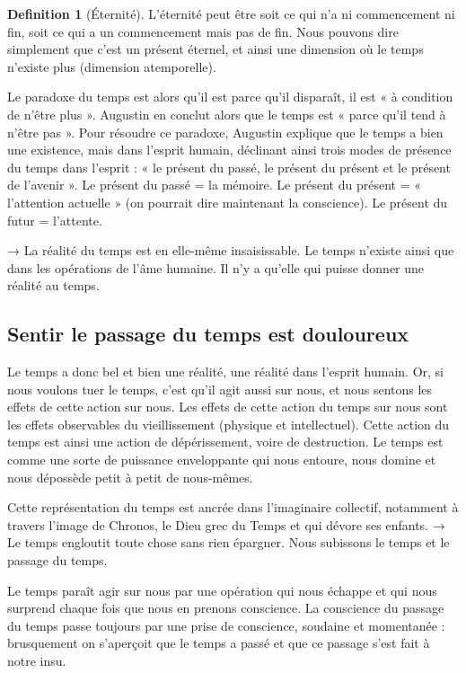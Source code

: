 \documentclass[french]{book}
\theoremstyle{definition}
\newtheorem*{dfn}{Definition}
\begin{document}
\begin{dfn}[Éternité]
L’éternité peut être soit ce qui n’a ni commencement ni fin, soit ce qui a un commencement mais pas de fin. Nous pouvons dire simplement que c’est un présent éternel, et ainsi une dimension où le temps n’existe plus (dimension atemporelle).
\end{dfn}

Le paradoxe du temps est alors qu’il est parce qu’il disparaît, il est « à condition de n’être plus ». Augustin en conclut alors que le temps est « parce qu’il tend à n’être pas ». Pour résoudre ce paradoxe, Augustin explique que le temps a bien une existence, mais dans l’esprit humain, déclinant ainsi trois modes de présence du temps dans l’esprit : « le présent du passé, le présent du présent et le présent de l’avenir ». Le présent du passé = la mémoire. Le présent du présent = « l’attention actuelle » (on pourrait dire maintenant la conscience). Le présent du futur = l’attente.

→ La réalité du temps est en elle-même insaisissable. Le temps n’existe ainsi que dans les opérations de l’âme humaine. Il n’y a qu’elle qui puisse donner une réalité au temps.

\subsection{Sentir le passage du temps est douloureux}

Le temps a donc bel et bien une réalité, une réalité dans l’esprit humain. Or, si nous voulons tuer le temps, c’est qu’il agit aussi sur nous, et nous sentons les effets de cette action sur nous. Les effets de cette action du temps sur nous sont les effets observables du vieillissement (physique et intellectuel). Cette action du temps est ainsi une action de dépérissement, voire de destruction. Le temps est comme une sorte de puissance enveloppante qui nous entoure, nous domine et nous dépossède petit à petit de nous-mêmes.

Cette représentation du temps est ancrée dans l’imaginaire collectif, notamment à travers l’image de Chronos, le Dieu grec du Temps et qui dévore ses enfants. → Le temps engloutit toute chose sans rien épargner. Nous subissons le temps et le passage du temps.

Le temps paraît agir sur nous par une opération qui nous échappe et qui nous surprend chaque fois que nous en prenons conscience. La conscience du passage du temps passe toujours par une prise de conscience, soudaine et momentanée : brusquement on s’aperçoit que le temps a passé et que ce passage s’est fait à notre insu.
\end{document}
